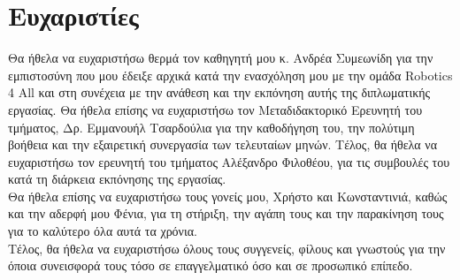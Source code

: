 \section*{Ευχαριστίες}
{}

Θα ήθελα να ευχαριστήσω θερμά τον καθηγητή μου κ. Ανδρέα Συμεωνίδη για την εμπιστοσύνη που μου έδειξε αρχικά κατά την ενασχόληση μου με την ομάδα Robotics 4 All και στη συνέχεια με την ανάθεση και την εκπόνηση αυτής της διπλωματικής εργασίας. Θα ήθελα επίσης να ευχαριστήσω τον Μεταδιδακτορικό Ερευνητή του τμήματος, Δρ. Εμμανουήλ Τσαρδούλια για την καθοδήγηση του, την πολύτιμη βοήθεια και την εξαιρετική συνεργασία των τελευταίων μηνών. Τέλος, θα ήθελα να ευχαριστήσω τον ερευνητή του τμήματος Αλέξανδρο Φιλοθέου, για τις συμβουλές του κατά τη διάρκεια εκπόνησης της εργασίας.\\

Θα ήθελα επίσης να ευχαριστήσω τους γονείς μου, Χρήστο και Κωνσταντινιά, καθώς και την αδερφή μου Φένια, για τη στήριξη, την αγάπη τους και την παρακίνηση τους για το καλύτερο όλα αυτά τα χρόνια. \\

Τέλος, θα ήθελα να ευχαριστήσω όλους τους συγγενείς, φίλους και γνωστούς για την όποια συνεισφορά τους τόσο σε επαγγελματικό όσο και σε προσωπικό επίπεδο.
